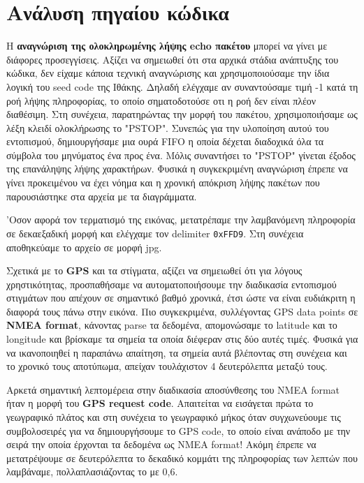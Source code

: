 \documentclass[hidelinks, 12pt, a4paper]{article}
\begin{document}
\section{Ανάλυση πηγαίου κώδικα}

Η \textbf{αναγνώριση της ολοκληρωμένης λήψης echo πακέτου} μπορεί να γίνει με διάφορες προσεγγίσεις. Αξίζει να σημειωθεί ότι στα αρχικά στάδια ανάπτυξης του κώδικα, δεν είχαμε κάποια τεχνική αναγνώρισης και χρησιμοποιούσαμε την ίδια λογική του seed code της Ιθάκης. Δηλαδή ελέγχαμε αν συναντούσαμε τιμή -1 κατά τη ροή λήψης πληροφορίας, το οποίο σηματοδοτούσε οτι η ροή δεν είναι πλέον διαθέσιμη. Στη συνέχεια, παρατηρώντας την μορφή του πακέτου, χρησιμοποιήσαμε ως λέξη κλειδί ολοκλήρωσης το "PSTOP". Συνεπώς για την υλοποίηση αυτού του εντοπισμού, δημιουργήσαμε μια ουρά FIFO η οποία δέχεται διαδοχικά όλα τα σύμβολα του μηνύματος ένα προς ένα. Μόλις συναντήσει το "PSTOP" γίνεται έξοδος της επανάληψης λήψης χαρακτήρων. Φυσικά η συγκεκριμένη αναγνώριση έπρεπε να γίνει προκειμένου να έχει νόημα και η χρονική απόκριση λήψης πακέτων που παρουσιάστηκε στα αρχεία με τα διαγράμματα.

'Οσον αφορά τον τερματισμό της εικόνας, μετατρέπαμε την λαμβανόμενη πληροφορία σε δεκαεξαδική μορφή και ελέγχαμε τον delimiter \verb|0xFFD9|. Στη συνέχεια αποθηκεύαμε το αρχείο σε μορφή jpg.

Σχετικά με το \textbf{GPS} και τα στίγματα, αξίζει να σημειωθεί ότι για λόγους χρηστικότητας, προσπαθήσαμε να αυτοματοποιήσουμε την διαδικασία εντοπισμού στιγμάτων που απέχουν σε σημαντικό βαθμό χρονικά, έτσι ώστε να είναι ευδιάκριτη η διαφορά τους πάνω στην εικόνα. Πιο συγκεκριμένα, συλλέγοντας GPS data points σε \textbf{NMEA format}, κάνοντας parse τα δεδομένα, απομονώσαμε το latitude και το longitude και βρίσκαμε τα σημεία τα οποία διέφεραν στις δύο αυτές τιμές. Φυσικά για να ικανοποιηθεί η παραπάνω απαίτηση, τα σημεία αυτά βλέποντας στη συνέχεια και το χρονικό τους αποτύπωμα, απείχαν τουλάχιστον 4 δευτερόλεπτα μεταξύ τους.

Αρκετά σημαντική λεπτομέρεια στην διαδικασία αποσύνθεσης του NMEA format ήταν η μορφή του \textbf{GPS request code}. Απαιτείται να εισάγεται πρώτα το γεωγραφικό πλάτος και στη συνέχεια το γεωγραφικό μήκος όταν συγχωνεύουμε τις συμβολοσειρές για να δημιουργήσουμε το GPS code, το οποίο είναι ανάποδο με την σειρά την οποία έρχονται τα δεδομένα ως NMEA format! Ακόμη έπρεπε να μετατρέψουμε σε δευτερόλεπτα το δεκαδικό κομμάτι της πληροφορίας των λεπτών που λαμβάναμε, πολλαπλασιάζοντας το με 0,6.
\end{document}
